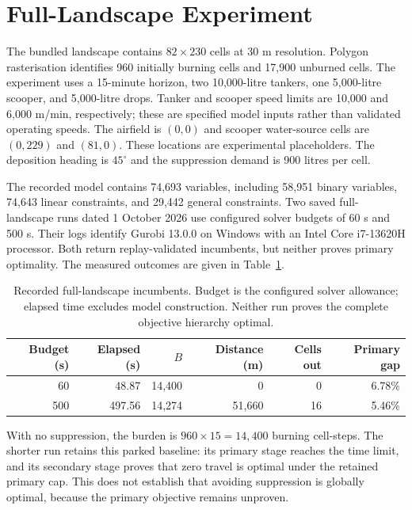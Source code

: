 \section{Full-Landscape Experiment}
\label{sec:validation-landscape}

The bundled landscape contains $82\times230$ cells at 30 m resolution. Polygon rasterisation identifies 960 initially burning cells and 17,900 unburned cells. The experiment uses a 15-minute horizon, two 10,000-litre tankers, one 5,000-litre scooper, and 5,000-litre drops. Tanker and scooper speed limits are 10,000 and 6,000 m/min, respectively; these are specified model inputs rather than validated operating speeds. The airfield is $(0,0)$ and scooper water-source cells are $(0,229)$ and $(81,0)$. These locations are experimental placeholders. The deposition heading is $45^\circ$ and the suppression demand is 900 litres per cell.

The recorded model contains 74,693 variables, including 58,951 binary variables, 74,643 linear constraints, and 29,442 general constraints. Two saved full-landscape runs dated 1 October 2026 use configured solver budgets of 60 s and 500 s. Their logs identify Gurobi 13.0.0 on Windows with an Intel Core i7-13620H processor. Both return replay-validated incumbents, but neither proves primary optimality. The measured outcomes are given in Table~\ref{tab:landscape-results}.

\begin{table}[htbp]
\centering
\small
\caption{Recorded full-landscape incumbents. Budget is the configured solver allowance; elapsed time excludes model construction. Neither run proves the complete objective hierarchy optimal.}
\label{tab:landscape-results}
\begin{tabular}{rrrrrr}
\hline
Budget (s) & Elapsed (s) & $B$ & Distance (m) & Cells out & Primary gap \\
\hline
60 & 48.87 & 14,400 & 0 & 0 & 6.78\% \\
500 & 497.56 & 14,274 & 51,660 & 16 & 5.46\% \\
\hline
\end{tabular}
\end{table}

With no suppression, the burden is $960\times15=14{,}400$ burning cell-steps. The shorter run retains this parked baseline: its primary stage reaches the time limit, and its secondary stage proves that zero travel is optimal under the retained primary cap. This does not establish that avoiding suppression is globally optimal, because the primary objective remains unproven.

